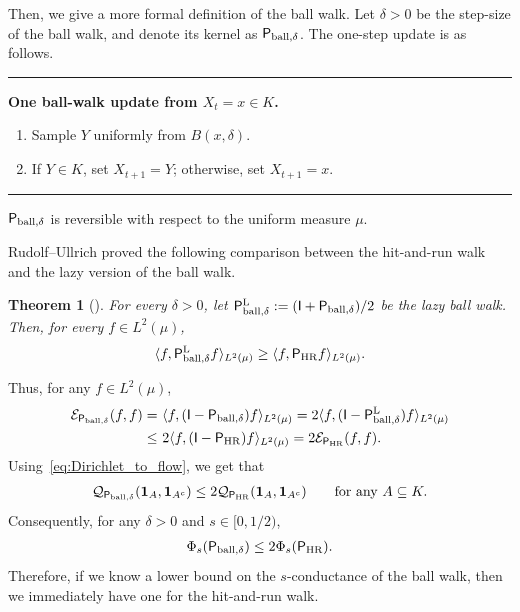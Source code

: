\documentclass[11pt]{article}
\newtheorem{theorem}{Theorem}[section]
\theoremstyle{definition}
\theoremstyle{remark}
\newcommand{\one}{\mathbf 1}
\newcommand{\Id}{\mathsf I}
\newcommand{\HR}{\mathsf P_{\mathrm{HR}}}
\begin{document}
Then, we give a more formal definition of the ball walk. Let $\delta>0$ be the step-size of the ball walk, and denote its kernel as ${\sf P}_{{\rm ball},\delta}$. The one-step update is as follows.
\begin{center}
\begin{minipage}{0.86\textwidth}
\hrule
\smallskip
\textbf{One ball-walk update from $X_t=x\in K$.}
\begin{enumerate}[leftmargin=2em,itemsep=2pt,topsep=4pt]
\item Sample $Y$ uniformly from $B(x,\delta)$.
\item If $Y\in K$, set $X_{t+1}=Y$; otherwise, set $X_{t+1}=x$.
\end{enumerate}
\smallskip
\hrule
\end{minipage}
\end{center}
${\sf P}_{{\rm ball},\delta}$ is reversible with respect to the uniform measure $\mu$. 

Rudolf--Ullrich proved the following comparison between the hit-and-run walk and the lazy version of the ball walk.

\begin{theorem}[{\cite[Theorem 5]{RudolfUllrichComparison}}]
For every $\delta>0$, let ${\sf P}_{{\rm ball},\delta}^{\rm L}:=(\Id+{\sf P}_{{\rm ball},\delta})/2$ be the lazy ball walk. Then, for every $f\in L^2(\mu)$,
\begin{equation}\label{eq:RU-comparison}
 \langle f, {\sf P}_{{\rm ball},\delta}^{\rm L} f\rangle_{L^2(\mu)}\geq \langle f, \HR f\rangle_{L^2(\mu)}.
\end{equation}
\end{theorem}

Thus, for any $f\in L^2(\mu)$,
\begin{align*}
    {\cal E}_{{\sf P}_{{\rm ball},\delta}}(f,f)=&~\langle f, (\Id-{\sf P}_{{\rm ball},\delta})f\rangle_{L^2(\mu)}  =  2\langle f, (\Id -{\sf P}_{{\rm ball},\delta}^{\rm L})f\rangle_{L^2(\mu)} \\
    \leq &~ 2\langle f, (\Id -\HR)f\rangle_{L^2(\mu)}=2{\cal E}_{\HR}(f,f).
\end{align*}
Using~\eqref{eq:Dirichlet_to_flow}, we get that
\begin{align*}
    {\cal Q}_{{\sf P}_{{\rm ball},\delta}}(\one_A,\one_{A^c})\leq 2{\cal Q}_{\HR}(\one_A,\one_{A^c})\qquad \text{for any}~A\subseteq K.
\end{align*}
Consequently, for any $\delta>0$ and $s\in [0,1/2)$,
\begin{align}
    \Phi_s({\sf P}_{{\rm ball},\delta})\leq 2\Phi_s(\HR).
\end{align}
Therefore, if we know a lower bound on the $s$-conductance of the ball walk, then we immediately have one for the hit-and-run walk.
\end{document}
